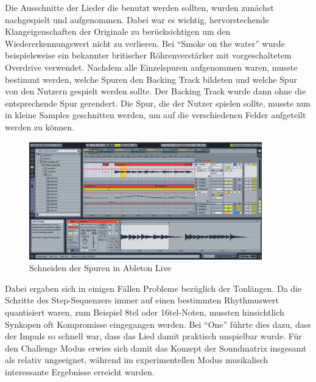 Die Ausschnitte der Lieder die benutzt werden sollten, wurden zunächst nachgespielt und aufgenommen. Dabei war es wichtig, hervorstechende Klangeigenschaften der Originale zu berücksichtigen um den Wiedererkennungswert nicht zu verlieren. Bei \enquote{Smoke on the water} wurde beispielsweise ein bekannter britischer Röhrenverstärker mit vorgeschaltetem Overdrive verwendet. Nachdem alle Einzelspuren aufgenommen waren, musste bestimmt werden, welche Spuren den Backing Track bildeten und welche Spur von den Nutzern gespielt werden sollte. Der Backing Track wurde dann ohne die entsprechende Spur gerendert. Die Spur, die der Nutzer spielen sollte, musste nun in kleine Samples geschnitten werden, um auf die verschiedenen Felder aufgeteilt werden zu können.

\begin{figure}[htbp] 
  \centering
     \includegraphics[width=0.9\textwidth]{images/Musikkonzeption}
  \caption{Schneiden der Spuren in Ableton Live}
  \label{fig:audio1}
\end{figure}

Dabei ergaben sich in einigen Fällen Probleme bezüglich der Tonlängen. Da die Schritte des Step-Sequenzers immer auf einen bestimmten Rhythmuswert quantisiert waren, zum Beispiel 8tel oder 16tel-Noten, mussten hinsichtlich Synkopen oft Kompromisse eingegangen werden. Bei \enquote{One} führte dies dazu, dass der Impuls so schnell war, dass das Lied damit praktisch unspielbar wurde. Für den Challenge Modus erwies sich damit das Konzept der Soundmatrix insgesamt als relativ ungeeignet, während im experimentellen Modus musikalisch interessante Ergebnisse erreicht wurden.